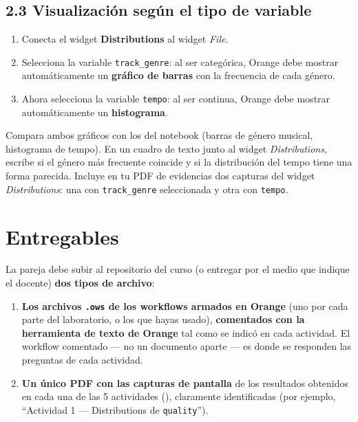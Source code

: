 \documentclass[11pt,letterpaper]{article}
\newcommand{\faPencil}{\raisebox{-0.1em}{\textbf{\Large\textbullet}}}
\begin{document}
\subsection{2.3 Visualización según el tipo de variable}

\begin{enumerate}[leftmargin=1.2cm]
  \item Conecta el widget \textbf{Distributions} al widget \textit{File}.
  \item Selecciona la variable \texttt{track\_genre}: al ser categórica, Orange debe mostrar automáticamente un \textbf{gráfico de barras} con la frecuencia de cada género.
  \item Ahora selecciona la variable \texttt{tempo}: al ser continua, Orange debe mostrar automáticamente un \textbf{histograma}.
\end{enumerate}

\begin{actividad}
Compara ambos gráficos con los del notebook (barras de género musical, histograma de tempo). En un cuadro de texto junto al widget \textit{Distributions}, escribe si el género más frecuente coincide y si la distribución del tempo tiene una forma parecida. Incluye en tu PDF de evidencias dos capturas del widget \textit{Distributions}: una con \texttt{track\_genre} seleccionada y otra con \texttt{tempo}.
\end{actividad}

\section{Entregables}

La pareja debe subir al repositorio del curso (o entregar por el medio que indique el docente) \textbf{dos tipos de archivo}:

\begin{enumerate}[leftmargin=1.2cm]
  \item \textbf{Los archivos \texttt{.ows} de los workflows armados en Orange} (uno por cada parte del laboratorio, o los que hayas usado), \textbf{comentados con la herramienta de texto de Orange} tal como se indicó en cada actividad. El workflow comentado --- no un documento aparte --- es donde se responden las preguntas de cada actividad.
  \item \textbf{Un único PDF con las capturas de pantalla} de los resultados obtenidos en cada una de las 5 actividades (\faPencil), claramente identificadas (por ejemplo, ``Actividad 1 --- Distributions de \texttt{quality}'').
\end{enumerate}
\end{document}
